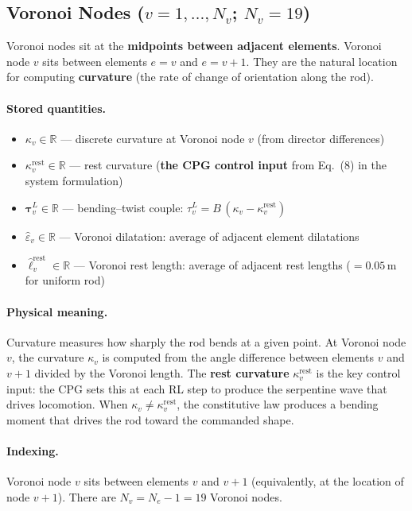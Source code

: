 \documentclass[11pt]{article}
\newcommand{\Real}{\mathbb{R}}
\begin{document}
\subsection{Voronoi Nodes ($v = 1, \ldots, N_v$; $N_v = 19$)}

Voronoi nodes sit at the \textbf{midpoints between adjacent elements}.
Voronoi node $v$ sits between elements $e = v$ and $e = v + 1$.
They are the natural location for computing \textbf{curvature} (the rate of change of orientation along the rod).

\paragraph{Stored quantities.}
\begin{itemize}
  \item $\kappa_v \in \Real$ --- discrete curvature at Voronoi node $v$ (from director differences)
  \item $\kappa_v^{\text{rest}} \in \Real$ --- rest curvature (\textbf{the CPG control input} from Eq.~(8) in the system formulation)
  \item $\bm{\tau}_v^L \in \Real$ --- bending--twist couple: $\tau_v^L = B\,(\kappa_v - \kappa_v^{\text{rest}})$
  \item $\hat{\varepsilon}_v \in \Real$ --- Voronoi dilatation: average of adjacent element dilatations
  \item $\hat{\ell}_v^{\text{rest}} \in \Real$ --- Voronoi rest length: average of adjacent rest lengths ($= 0.05$\,m for uniform rod)
\end{itemize}

\paragraph{Physical meaning.}
Curvature measures how sharply the rod bends at a given point.
At Voronoi node $v$, the curvature $\kappa_v$ is computed from the angle difference between elements $v$ and $v+1$ divided by the Voronoi length.
The \textbf{rest curvature} $\kappa_v^{\text{rest}}$ is the key control input: the CPG sets this at each RL step to produce the serpentine wave that drives locomotion.
When $\kappa_v \neq \kappa_v^{\text{rest}}$, the constitutive law produces a bending moment that drives the rod toward the commanded shape.

\paragraph{Indexing.}
Voronoi node $v$ sits between elements $v$ and $v+1$ (equivalently, at the location of node $v+1$).
There are $N_v = N_e - 1 = 19$ Voronoi nodes.
\end{document}
